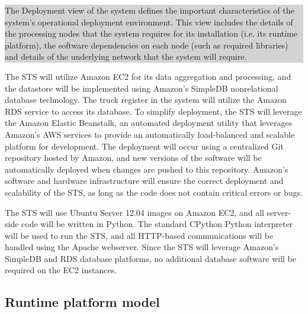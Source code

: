 \documentclass[a4paper,11pt]{report}
\newcommand{\instructions}[1]{
  \noindent\colorbox{lightgray}{%
    \parbox{\linewidth}{%
      #1
    }%
  }%
 \vspace{0.1cm}
}
\begin{document}
\instructions{
The Deployment view of the system defines the important
characteristics of the system’s operational deployment
environment. This view includes the details of the processing nodes
that the system requires for its installation (i.e. its runtime
platform), the software dependencies on each node (such as required
libraries) and details of the underlying network that the system will
require.
}

The STS will utilize Amazon EC2 for its data aggregation and processing, and
the datastore will be implemented using Amazon's SimpleDB nonrelational
database technology. The truck register in the system will utilize the Amazon
RDS service to access its database. To simplify deployment, the STS will
leverage the Amazon Elastic Beanstalk, an automated deployment utility that
leverages Amazon's AWS services to provide an automatically load-balanced and
scalable platform for development. The deployment will occur using a
centralized Git repository hosted by Amazon, and new versions of the software
will be automatically deployed when changes are pushed to this repository.
Amazon's software and hardware infrastructure will ensure the correct
deployment and scalability of the STS, as long as the code does not contain
critical errors or bugs.

The STS will use Ubuntu Server 12.04 images on Amazon EC2, and all server-side
code will be written in Python. The standard CPython Python interpreter will be
used to run the STS, and all HTTP-based communications will be handled using the
Apache webserver. Since the STS will leverage Amazon's SimpleDB and RDS database
platforms, no additional database software will be required on the EC2
instances.

\subsection{Runtime platform model}
\label{sec:runt-platf-model}
\end{document}
